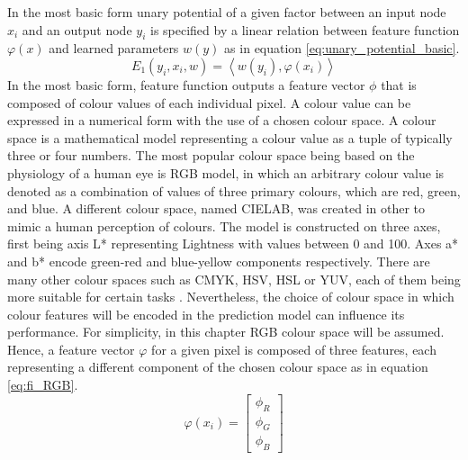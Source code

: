 In the most basic form unary potential of a given factor between an input node $x_i$ and an output node $y_i$ is specified by a linear relation between feature function $\varphi(x)$ and learned parameters $w(y)$ \cite{Nowozin} as in equation \ref{eq:unary_potential_basic}.
\begin{equation}
    \label{eq:unary_potential_basic}
    E_1(y_i,x_i,w) =  \left \langle w(y_i), \varphi(x_i) \right \rangle 
\end{equation}
In the most basic form, feature function outputs a feature vector $\phi$ that is composed of colour values of each individual pixel. A colour value can be expressed in a numerical form with the use of a chosen colour space. A colour space is a mathematical model representing a colour value as a tuple of typically three or four numbers. The most popular colour space being based on the physiology of a human eye is RGB model, in which an arbitrary colour value is denoted as a combination of values of three primary colours, which are red, green, and blue. A different colour space, named CIELAB, was created in other to mimic a human perception of colours. The model is constructed on three axes, first being axis L* representing Lightness with values between 0 and 100. Axes a* and b* encode green-red and blue-yellow components respectively. There are many other colour spaces such as CMYK, HSV, HSL or YUV, each of them being more suitable for certain tasks \cite{colour_space}. Nevertheless, the choice of colour space in which colour features will be encoded in the prediction model can influence its performance. For simplicity, in this chapter RGB colour space will be assumed. Hence, a feature vector $\varphi$ for a given pixel is composed of three features, each representing a different component of the chosen colour space as in equation \ref{eq:fi_RGB}.
\begin{equation}
    \label{eq:fi_RGB}
    \varphi(x_i) = \begin{bmatrix}
        \phi_R\\ 
        \phi_G\\ 
        \phi_B
    \end{bmatrix}
\end{equation}

